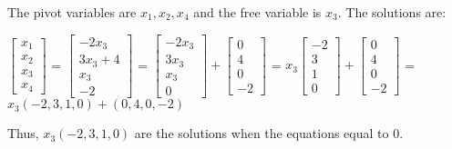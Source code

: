 \begin{tbox}
        \normalsize
        The pivot variables are $x_1,x_2,x_4$
        and the free variable is $x_3$.
        The solutions are:

        \hspace{0.5cm}
        \small
        $\begin{bmatrix}
            x_1 \\
            x_2 \\
            x_3 \\
            x_4
        \end{bmatrix}$ =
        $\begin{bmatrix}
            -2x_3 \\
            3x_3 + 4 \\
            x_3 \\
            -2
        \end{bmatrix}$ =
        $\begin{bmatrix}
            -2x_3 \\
            3x_3 \\
            x_3 \\
            0
        \end{bmatrix} +
        \begin{bmatrix}
            0 \\
            4 \\
            0 \\
            -2
        \end{bmatrix}$ =
        $x_3\begin{bmatrix}
            -2 \\
            3 \\
            1 \\
            0
        \end{bmatrix} +
        \begin{bmatrix}
            0 \\
            4 \\
            0 \\
            -2
        \end{bmatrix}$
        = $x_3(-2,3,1,0) + (0,4,0,-2)$

        \normalsize
        Thus, $x_3(-2,3,1,0)$
        are the solutions when the equations equal to 0.
    \end{tbox}





